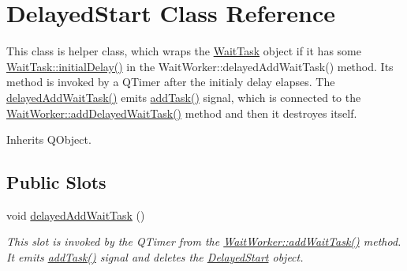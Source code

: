 \hypertarget{class_delayed_start}{}\section{Delayed\+Start Class Reference}
\label{class_delayed_start}


This class is helper class, which wraps the \hyperlink{class_wait_task}{Wait\+Task} object if it has some \hyperlink{class_wait_task_a3984ae37eae1a984db2f2417df2bfbbf}{Wait\+Task\+::initial\+Delay()} in the Wait\+Worker\+::delayed\+Add\+Wait\+Task() method. Its method is invoked by a Q\+Timer after the initialy delay elapses. The \hyperlink{class_delayed_start_a579d849a61a9f20cb29bc18d5be7611a}{delayed\+Add\+Wait\+Task()} emits \hyperlink{class_delayed_start_ab12e84ab2900082373f556051f260c9c}{add\+Task()} signal, which is connected to the \hyperlink{class_wait_worker_a71dec4dbc5a123f20d0a5a7f707ed5a3}{Wait\+Worker\+::add\+Delayed\+Wait\+Task()} method and then it destroyes itself.  




Inherits Q\+Object.

\subsection*{Public Slots}
\begin{DoxyCompactItemize}
\item 
\hypertarget{class_delayed_start_a579d849a61a9f20cb29bc18d5be7611a}{}void \hyperlink{class_delayed_start_a579d849a61a9f20cb29bc18d5be7611a}{delayed\+Add\+Wait\+Task} ()\label{class_delayed_start_a579d849a61a9f20cb29bc18d5be7611a}

\begin{DoxyCompactList}\small\item\em This slot is invoked by the Q\+Timer from the \hyperlink{class_wait_worker_adaff9ea88795fa9d902711c1952828cd}{Wait\+Worker\+::add\+Wait\+Task()} method. It emits \hyperlink{class_delayed_start_ab12e84ab2900082373f556051f260c9c}{add\+Task()} signal and deletes the \hyperlink{class_delayed_start}{Delayed\+Start} object. \end{DoxyCompactList}\end{DoxyCompactItemize}

